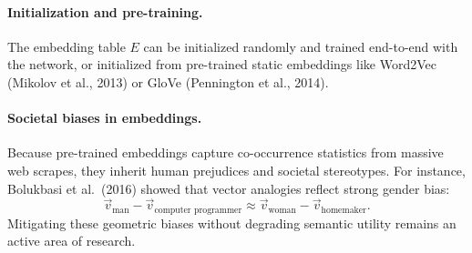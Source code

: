 \documentclass[11pt,a4paper]{article}
\theoremstyle{definition}
\theoremstyle{plain}
\begin{document}
\paragraph{Initialization and pre-training.}
The embedding table $E$ can be initialized randomly and trained end-to-end with the network, or initialized from pre-trained static embeddings like Word2Vec (Mikolov et al., 2013) or GloVe (Pennington et al., 2014).

\paragraph{Societal biases in embeddings.}
Because pre-trained embeddings capture co-occurrence statistics from massive web scrapes, they inherit human prejudices and societal stereotypes. For instance, Bolukbasi et al.\ (2016) showed that vector analogies reflect strong gender bias:
\begin{equation*}
\vec{v}_{\text{man}} - \vec{v}_{\text{computer programmer}} \approx \vec{v}_{\text{woman}} - \vec{v}_{\text{homemaker}}.
\end{equation*}
Mitigating these geometric biases without degrading semantic utility remains an active area of research.
\end{document}

